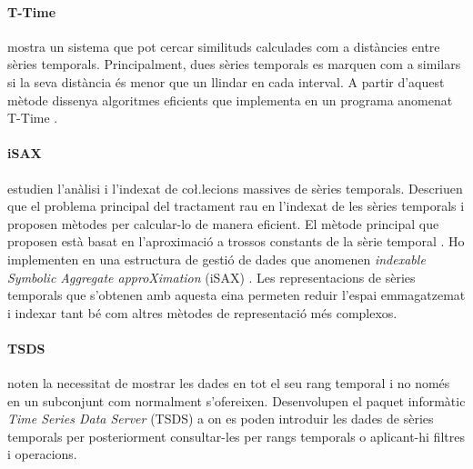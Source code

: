 \paragraph{T-Time}  \textcite{assfalg08:thesis} mostra un sistema que pot cercar similituds calculades com a distàncies entre sèries temporals. Principalment, dues sèries temporals es marquen com a similars si la seva distància és menor que un llindar en cada interval. A partir d'aquest mètode dissenya algoritmes eficients que implementa en un programa anomenat T-Time \parencite{assfalg08:ttime}.


 
\paragraph{iSAX} \textcite{keogh08:isax,keogh10:isax} estudien l'anàlisi i l'indexat de co\l.lecions massives de sèries temporals. Descriuen que el problema principal del tractament rau en l'indexat de les sèries temporals i proposen mètodes per calcular-lo de manera eficient. El mètode principal que proposen està basat en l'aproximació a trossos constants de la sèrie temporal \parencite{keogh00}.  Ho implementen en una estructura de gestió de dades que anomenen \emph{indexable Symbolic Aggregate approXimation} (iSAX) \parencite{isax}. Les representacions de sèries temporals que s'obtenen amb aquesta eina permeten reduir l'espai emmagatzemat i indexar tant bé com altres mètodes de representació més complexos.




\paragraph{TSDS} \textcite{weigel10} noten la necessitat de mostrar les dades en tot el seu rang temporal i no només en un subconjunt com normalment s'ofereixen. Desenvolupen el paquet informàtic \emph{Time Series Data Server} (TSDS) \parencite{tsds} a on es poden introduir les dades de sèries temporals per posteriorment consultar-les per rangs temporals o aplicant-hi filtres i operacions.





